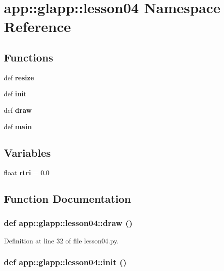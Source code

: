 \section{app::glapp::lesson04 Namespace Reference}
\label{namespaceapp_1_1glapp_1_1lesson04}


\subsection*{Functions}
\begin{CompactItemize}
\item 
def {\bf resize}
\item 
def {\bf init}
\item 
def {\bf draw}
\item 
def {\bf main}
\end{CompactItemize}
\subsection*{Variables}
\begin{CompactItemize}
\item 
float {\bf rtri} = 0.0
\end{CompactItemize}


\subsection{Function Documentation}
\subsubsection{\setlength{\rightskip}{0pt plus 5cm}def app::glapp::lesson04::draw ()}\label{namespaceapp_1_1glapp_1_1lesson04_a8141b5f01404e45e1b8afb204c0932a}




Definition at line 32 of file lesson04.py.
\subsubsection{\setlength{\rightskip}{0pt plus 5cm}def app::glapp::lesson04::init ()}\label{namespaceapp_1_1glapp_1_1lesson04_b16259550991850784b9c874a48d82be}




